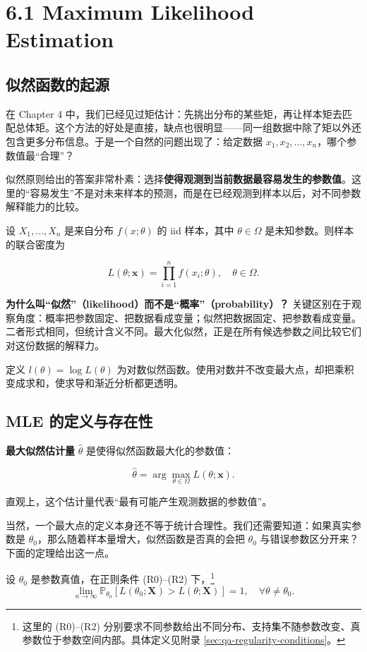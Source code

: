 \section{6.1 Maximum Likelihood Estimation}\label{sec:6.1}

\subsection{似然函数的起源}

在 Chapter 4 中，我们已经见过矩估计：先挑出分布的某些矩，再让样本矩去匹配总体矩。这个方法的好处是直接，缺点也很明显——同一组数据中除了矩以外还包含更多分布信息。于是一个自然的问题出现了：给定数据 $x_1, x_2, \ldots, x_n$，哪个参数值最``合理''？

似然原则给出的答案非常朴素：选择\textbf{使得观测到当前数据最容易发生的参数值}。这里的``容易发生''不是对未来样本的预测，而是在已经观测到样本以后，对不同参数解释能力的比较。

设 $X_1, \ldots, X_n$ 是来自分布 $f(x;\theta)$ 的 iid 样本，其中 $\theta \in \Omega$ 是未知参数。则样本的联合密度为

\[
L(\theta; \mathbf{x}) = \prod_{i=1}^n f(x_i; \theta), \quad \theta \in \Omega.
\label{eq:likelihood-function}
\]

\textbf{为什么叫``似然''（likelihood）而不是``概率''（probability）？} 关键区别在于观察角度：概率把参数固定、把数据看成变量；似然把数据固定、把参数看成变量。二者形式相同，但统计含义不同。最大化似然，正是在所有候选参数之间比较它们对这份数据的解释力。

定义 $l(\theta) = \log L(\theta)$ 为对数似然函数。使用对数并不改变最大点，却把乘积变成求和，使求导和渐近分析都更透明。

\subsection{MLE 的定义与存在性}

\textbf{最大似然估计量} $\widehat{\theta}$ 是使得似然函数最大化的参数值：

\[
\widehat{\theta} = \arg\max_{\theta \in \Omega} L(\theta; \mathbf{x}).
\label{eq:mle-definition-ch6}
\]

直观上，这个估计量代表``最有可能产生观测数据的参数值''。

当然，一个最大点的定义本身还不等于统计合理性。我们还需要知道：如果真实参数是 $\theta_0$，那么随着样本量增大，似然函数是否真的会把 $\theta_0$ 与错误参数区分开来？下面的定理给出这一点。

\begin{theorem}[似然函数的渐近支撑]\label{th:likelihood-asymptotic}
设 $\theta_0$ 是参数真值，在正则条件 (R0)--(R2) 下，\footnote{这里的 (R0)--(R2) 分别要求不同参数给出不同分布、支持集不随参数改变、真参数位于参数空间内部。具体定义见附录 \cref{sec:qa-regularity-conditions}。}
\[
\lim_{n \to \infty} \mathbb{P}_{\theta_0}\left[ L(\theta_0; \mathbf{X}) > L(\theta; \mathbf{X}) \right] = 1, \quad \forall \theta \neq \theta_0.
\label{eq:likelihood-asymptotic}
\]
\end{theorem}

